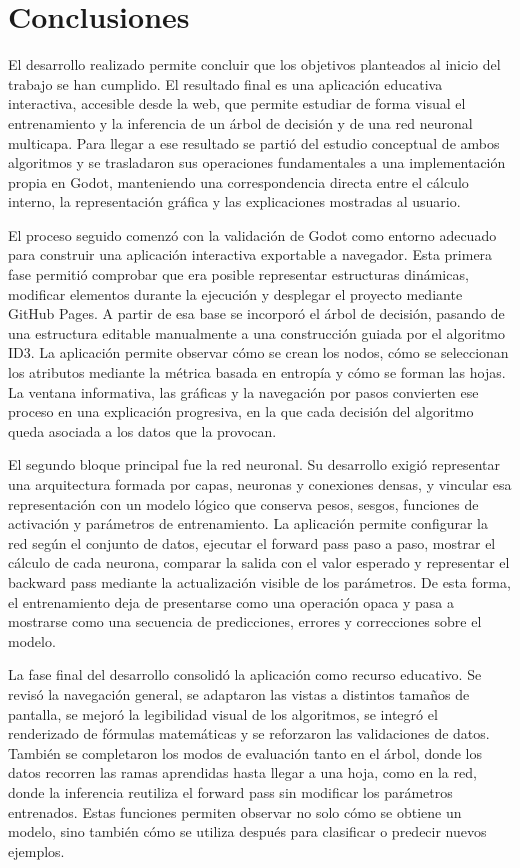 \chapter{Conclusiones}
\label{chap:conclusiones}

El desarrollo realizado permite concluir que los objetivos planteados al inicio del trabajo se han cumplido.
El resultado final es una aplicación educativa interactiva, accesible desde la web, que permite estudiar de forma visual el entrenamiento y la inferencia de un árbol de decisión y de una red neuronal multicapa.
Para llegar a ese resultado se partió del estudio conceptual de ambos algoritmos y se trasladaron sus operaciones fundamentales a una implementación propia en Godot, manteniendo una correspondencia directa entre el cálculo interno, la representación gráfica y las explicaciones mostradas al usuario.

El proceso seguido comenzó con la validación de Godot como entorno adecuado para construir una aplicación interactiva exportable a navegador.
Esta primera fase permitió comprobar que era posible representar estructuras dinámicas, modificar elementos durante la ejecución y desplegar el proyecto mediante GitHub Pages.
A partir de esa base se incorporó el árbol de decisión, pasando de una estructura editable manualmente a una construcción guiada por el algoritmo ID3.
La aplicación permite observar cómo se crean los nodos, cómo se seleccionan los atributos mediante la métrica basada en entropía y cómo se forman las hojas.
La ventana informativa, las gráficas y la navegación por pasos convierten ese proceso en una explicación progresiva, en la que cada decisión del algoritmo queda asociada a los datos que la provocan.

El segundo bloque principal fue la red neuronal.
Su desarrollo exigió representar una arquitectura formada por capas, neuronas y conexiones densas, y vincular esa representación con un modelo lógico que conserva pesos, sesgos, funciones de activación y parámetros de entrenamiento.
La aplicación permite configurar la red según el conjunto de datos, ejecutar el forward pass paso a paso, mostrar el cálculo de cada neurona, comparar la salida con el valor esperado y representar el backward pass mediante la actualización visible de los parámetros.
De esta forma, el entrenamiento deja de presentarse como una operación opaca y pasa a mostrarse como una secuencia de predicciones, errores y correcciones sobre el modelo.

La fase final del desarrollo consolidó la aplicación como recurso educativo.
Se revisó la navegación general, se adaptaron las vistas a distintos tamaños de pantalla, se mejoró la legibilidad visual de los algoritmos, se integró el renderizado de fórmulas matemáticas y se reforzaron las validaciones de datos.
También se completaron los modos de evaluación tanto en el árbol, donde los datos recorren las ramas aprendidas hasta llegar a una hoja, como en la red, donde la inferencia reutiliza el forward pass sin modificar los parámetros entrenados.
Estas funciones permiten observar no solo cómo se obtiene un modelo, sino también cómo se utiliza después para clasificar o predecir nuevos ejemplos.

